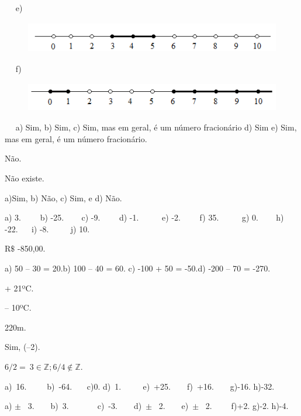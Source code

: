 \begin{respostas}{2}
\begin{figure}[H]
\begin{Center}
	\end{Center}
\end{figure}
~~
e)
\begin{figure}[H]
	\begin{Center}
		\includegraphics[width=4.94in,height=0.54in]{capitulos/conjuntos_numericos/media/image15.png}
	\end{Center}
\end{figure}
~~
f)
\begin{figure}[H]
	\begin{Center}
		\includegraphics[width=4.83in,height=0.5in]{capitulos/conjuntos_numericos/media/image16.png}
	\end{Center}
\end{figure}
~~
	\ansitem{} a) Sim, b) Sim, c) Sim, mas em geral, é um número fracionário d) Sim e) Sim, mas em geral, é um número fracionário.

    \ansitem{} Não.

	\ansitem{} Não existe.

	\ansitem{} a)Sim, b) Não, c) Sim, e d) Não.

\end{respostas}

\begin{respostas}{3}
	\ansitem{} a) 3.~~~~ b) -25.~~ ~ c) -9.~~~~ d) -1.~~~~~ e) -2.~~~~ f) 35.~~~~~ g) 0.~~ ~ h) -22.~ ~  i) -8. ~~~~ j) 10.

	\ansitem{} R$\$$  -850,00.

	\ansitem{} a) 50 – 30 = 20.\quad b) 100 – 40 = 60.  \quad c) -100 + 50 = -50.\quad d) -200 – 70 = -270.

	\ansitem{} + 21ºC.

	\ansitem{} – 10ºC.

	\ansitem{} 220m.

	\ansitem{} Sim, (–2).

	\ansitem{} \( 6/2=~3   \in \mathbb{Z};6/4 \notin  \mathbb{Z} \).  

\ansitem{} a)~16.~~~~~b)~-64.~~~ c)0.     d)~1.~~  ~~ e)~+25.~~~~f)~+16.~~~~g)-16.     h)-32.

\ansitem{}a) $ \pm $ ~3.~~~~b)~3.~~~~~~~c)~-3.~~~~d)~$ \pm $ ~2.~~~~e)~$ \pm $ ~2.~~~~ f)+2.      g)-2.       h)-4.
\end{respostas}

